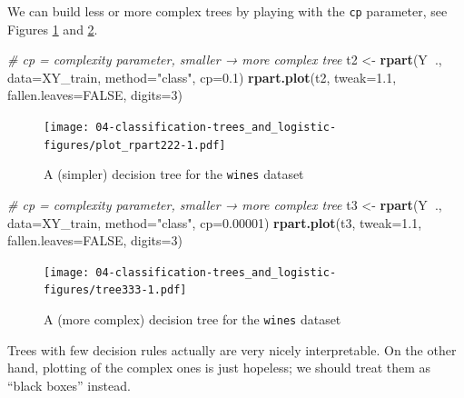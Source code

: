 \documentclass[10pt,b5paper,krantz1]{krantz}
\newenvironment{Shaded}{\begin{snugshade}}{\end{snugshade}}
\newcommand{\CommentTok}[1]{\textcolor[rgb]{0.37,0.37,0.37}{\textit{#1}}}
\newcommand{\DataTypeTok}[1]{\textcolor[rgb]{0.27,0.27,0.27}{#1}}
\newcommand{\DecValTok}[1]{\textcolor[rgb]{0.06,0.06,0.06}{#1}}
\newcommand{\FloatTok}[1]{\textcolor[rgb]{0.06,0.06,0.06}{#1}}
\newcommand{\KeywordTok}[1]{\textcolor[rgb]{0.27,0.27,0.27}{\textbf{#1}}}
\newcommand{\NormalTok}[1]{#1}
\newcommand{\OperatorTok}[1]{\textcolor[rgb]{0.43,0.43,0.43}{\textbf{#1}}}
\newcommand{\OtherTok}[1]{\textcolor[rgb]{0.37,0.37,0.37}{#1}}
\newcommand{\StringTok}[1]{\textcolor[rgb]{0.5,0.5,0.5}{#1}}
\begin{document}
We can build less or more complex trees by playing
with the \texttt{cp} parameter, see Figures \ref{fig:plot_rpart222}
and \ref{fig:tree333}.

\begin{Shaded}
\begin{Highlighting}[]
\CommentTok{# cp = complexity parameter, smaller → more complex tree}
\NormalTok{t2 <-}\StringTok{ }\KeywordTok{rpart}\NormalTok{(Y}\OperatorTok{~}\NormalTok{., }\DataTypeTok{data=}\NormalTok{XY_train, }\DataTypeTok{method=}\StringTok{"class"}\NormalTok{, }\DataTypeTok{cp=}\FloatTok{0.1}\NormalTok{)}
\KeywordTok{rpart.plot}\NormalTok{(t2, }\DataTypeTok{tweak=}\FloatTok{1.1}\NormalTok{, }\DataTypeTok{fallen.leaves=}\OtherTok{FALSE}\NormalTok{, }\DataTypeTok{digits=}\DecValTok{3}\NormalTok{)}
\end{Highlighting}
\end{Shaded}

\begin{figure}
\hypertarget{fig:plot_rpart222}{%
\centering
\texttt{[image: 04-classification-trees\_and\_logistic-figures/plot\_rpart222-1.pdf]}
\caption{A (simpler) decision tree for the \texttt{wines} dataset}\label{fig:plot_rpart222}
}
\end{figure}

\begin{Shaded}
\begin{Highlighting}[]
\CommentTok{# cp = complexity parameter, smaller → more complex tree}
\NormalTok{t3 <-}\StringTok{ }\KeywordTok{rpart}\NormalTok{(Y}\OperatorTok{~}\NormalTok{., }\DataTypeTok{data=}\NormalTok{XY_train, }\DataTypeTok{method=}\StringTok{"class"}\NormalTok{, }\DataTypeTok{cp=}\FloatTok{0.00001}\NormalTok{)}
\KeywordTok{rpart.plot}\NormalTok{(t3, }\DataTypeTok{tweak=}\FloatTok{1.1}\NormalTok{, }\DataTypeTok{fallen.leaves=}\OtherTok{FALSE}\NormalTok{, }\DataTypeTok{digits=}\DecValTok{3}\NormalTok{)}
\end{Highlighting}
\end{Shaded}

\begin{figure}
\hypertarget{fig:tree333}{%
\centering
\texttt{[image: 04-classification-trees\_and\_logistic-figures/tree333-1.pdf]}
\caption{A (more complex) decision tree for the \texttt{wines} dataset}\label{fig:tree333}
}
\end{figure}

Trees with few decision rules actually are very nicely interpretable.
On the other hand, plotting of the complex ones is just hopeless;
we should treat them as ``black boxes'' instead.
\end{document}
